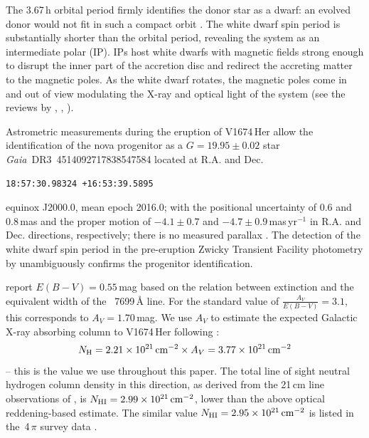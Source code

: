 \documentclass[a4paper,fleqn,usenatbib]{mnras}
\newcommand{\nova}{V1674\,Her}
\begin{document}

The 3.67\,h orbital period firmly identifies the donor star as a dwarf: 
an evolved donor would not fit in such a compact orbit \citep{2011ApJS..194...28K}. 
The white dwarf spin period is substantially shorter than the orbital period, 
revealing the system as an intermediate polar (IP). 
IPs host white dwarfs with magnetic fields strong enough to 
disrupt the inner part of the accretion disc and redirect the accreting
matter to the magnetic poles. As the white dwarf rotates, the magnetic poles
come in and out of view modulating the X-ray and optical light of the system  
(see the reviews by \citealt{1994PASP..106..209P}, \citealt{2000NewAR..44...63B}, \citealt{2017PASP..129f2001M}).

Astrometric measurements during the eruption of \nova{} \citep[e.g.][]{2021ATel14710....1A}
allow the identification of the nova progenitor as a $G = 19.95 \pm 0.02$ star 
{\em Gaia}~DR3~4514092717838547584 located at R.A. and Dec. 
\begin{verbatim}
18:57:30.98324 +16:53:39.5895
\end{verbatim}
equinox J2000.0, mean epoch 2016.0;
with the positional uncertainty of 0.6 and 0.8\,mas 
and the proper motion of  
$-4.1 \pm 0.7$ and $-4.7 \pm 0.9$\,mas\,yr$^{-1}$ in R.A. and Dec. directions,
respectively; there is no measured parallax 
\citep{2016A&A...595A...1G,2022arXiv220800211G}.
The detection of the white dwarf spin period in the pre-eruption Zwicky Transient Facility
\citep{2019PASP..131a8003M} photometry by \cite{2021ATel14720....1M}
unambiguously confirms the progenitor identification.

\cite{2021ATel14704....1M} report $E(B-V)=0.55$\,mag based on the \cite{1997A&A...318..269M} relation between extinction and 
the equivalent width of the ~7699\,\AA{} line.
For the standard value of $\frac{A_V}{E(B-V)}=3.1$, this corresponds to $A_V = 1.70$\,mag.
We use $A_V$ to estimate the expected Galactic X-ray absorbing column to \nova{} following \cite{2009MNRAS.400.2050G}: 
\begin{equation}
N_\mathrm{H} = 2.21 \times 10^{21}\,{\rm cm}^{-2} \times A_V = 3.77 \times 10^{21}\,{\rm cm}^{-2}
\end{equation}
-- this is the value we use throughout this paper. 
The total line of sight neutral hydrogen column density in this direction, as derived from the 21\,cm line observations of
\cite{2005A&A...440..775K}, %
is $N_{\rm HI} = 2.99 \times 10^{21}\,{\rm cm}^{-2}$, 
lower than the above optical reddening-based estimate. 
The similar value $N_{\rm HI} = 2.95 \times 10^{21}\,{\rm cm}^{-2}$ is listed in 
the \,4\,$\pi$ survey data \citep[HI4PI;][]{2016A&A...594A.116H}.
\end{document}
